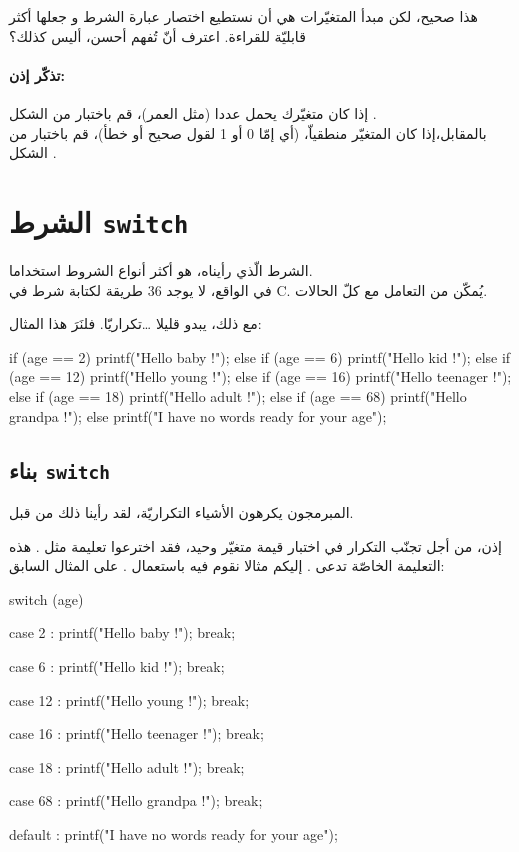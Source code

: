 هذا صحيح، لكن مبدأ المتغيّرات هي أن نستطيع اختصار عبارة الشرط و جعلها أكثر قابليّة للقراءة. اعترف أنّ
تُفهم أحسن، أليس كذلك؟

\paragraph{تذكّر إذن:}
إذا كان متغيّرك يحمل عددا (مثل العمر)، قم باختبار من الشكل
.\\
بالمقابل،إذا كان المتغيّر منطقياّ، (أي إمّا 0 أو 1 لقول صحيح أو خطأ)، قم باختبار من الشكل
.

\section{الشرط \texttt{switch}}

الشرط
الّذي رأيناه، هو أكثر أنواع الشروط استخداما.\\
في الواقع، لا يوجد 36 طريقة لكتابة شرط في \textenglish{C}.
يُمكّن من التعامل مع كلّ الحالات.

مع ذلك،
يبدو قليلا \dots تكراريّا. فلنَرَ هذا المثال:

\begin{Csource}
if (age == 2)
{
	printf("Hello baby !");
}
else if (age == 6)
{
	printf("Hello kid !");
}
else if (age == 12)
{
	printf("Hello young !");
}
else if (age == 16)
{
	printf("Hello teenager !");
}
else if (age == 18)
{
	printf("Hello adult !");
}
else if (age == 68)
{
	printf("Hello grandpa !");
}
else
{
	printf("I have no words ready for your age");
}
\end{Csource}

\subsection{بناء \texttt{switch}}

المبرمجون يكرهون الأشياء التكراريّة، لقد رأينا ذلك من قبل.

إذن، من أجل تجنّب التكرار في اختبار قيمة متغيّر وحيد، فقد اخترعوا تعليمة مثل
.
هذه التعليمة الخاصّة تدعى
.
إليكم مثالا نقوم فيه باستعمال
.
على المثال السابق:

\begin{Csource}
switch (age)
{
	case 2 :
	printf("Hello baby !");
	break;
	
	case 6 :
	printf("Hello kid !");
	break;
	
	case 12 :
	printf("Hello young !");
	break;
	
	case 16 :
	printf("Hello teenager !");
	break;
	
	case 18 :
	printf("Hello adult !");
	break;
	
	case 68 :
	printf("Hello grandpa !");
	break;
	
	default :
	printf("I have no words ready for your age");
}
\end{Csource}


